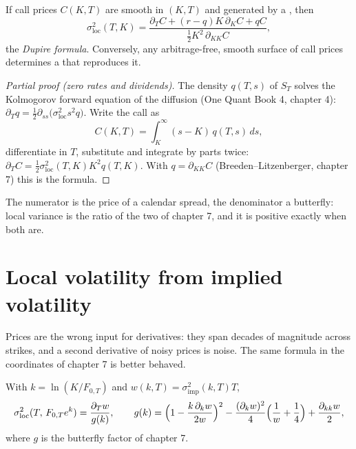 \begin{theorem}\label{thm:dv:local-volatility:dupire}
If call prices $C(K,T)$ are smooth in $(K,T)$ and generated by a , then
\[
\sigma_{\mathrm{loc}}^2(T,K)=\frac{\partial_TC+(r-q)K\,\partial_KC+qC}{\tfrac12K^2\,\partial_{KK}C},
\]
the \emph{Dupire formula}. Conversely, any arbitrage-free, smooth
surface of call prices determines a  that reproduces it.
\end{theorem}
\begin{proof}[Partial proof (zero rates and dividends)]
The density $q(T,s)$ of $S_T$ solves the Kolmogorov forward equation of the diffusion (One Quant
Book 4, chapter 4): $\partial_Tq=\tfrac12\partial_{ss}\bigl(\sigma_{\mathrm{loc}}^2s^2q\bigr)$.
Write the call as
\[
C(K,T)=\int_K^\infty(s-K)\,q(T,s)\,ds,
\]
differentiate in $T$, substitute and integrate by parts twice:
$\partial_TC=\tfrac12\sigma_{\mathrm{loc}}^2(T,K)K^2q(T,K)$. With $q=\partial_{KK}C$
(Breeden--Litzenberger, chapter 7) this is the formula.
\end{proof}

The numerator is the price of a calendar spread, the denominator a butterfly: local variance is
the ratio of the two  of chapter 7, and it is positive exactly when both are.

\section{Local volatility from implied volatility}

Prices are the wrong input for derivatives: they span decades of magnitude across strikes, and a
second derivative of noisy prices is noise. The same formula in the coordinates of chapter 7 is
better behaved.

\begin{proposition}\label{prop:dv:local-volatility:w}
With $k=\ln(K/F_{0,T})$ and $w(k,T)=\sigma_{\mathrm{imp}}^2(k,T)T$,
\[
\sigma_{\mathrm{loc}}^2(T,\,F_{0,T}e^k)=\frac{\partial_Tw}{g(k)},\qquad
g(k)=\Bigl(1-\frac{k\,\partial_kw}{2w}\Bigr)^2-\frac{(\partial_kw)^2}{4}\Bigl(\frac1w+\frac14\Bigr)
+\frac{\partial_{kk}w}2 ,
\]
where $g$ is the butterfly factor of chapter 7.
\end{proposition}
\admitted

